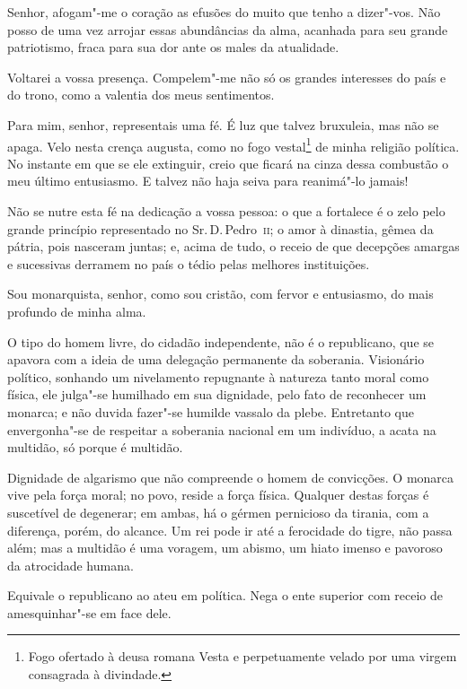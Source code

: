 \begin{linenumbers}

Senhor, afogam"-me o coração as efusões do muito que tenho a
dizer"-vos. Não posso de uma vez arrojar essas abundâncias da alma,
acanhada para seu grande patriotismo, fraca para sua dor ante os males da atualidade.

Voltarei a vossa presença. Compelem"-me não só os grandes interesses do
país e do trono, como a valentia dos meus sentimentos.

Para mim, senhor, representais uma fé. É luz que talvez bruxuleia, mas
não se apaga. Velo nesta crença augusta, como no fogo
vestal\footnote{ Fogo ofertado à deusa romana Vesta e
perpetuamente velado por uma virgem consagrada à divindade.} 
de minha religião política. No instante em que se ele extinguir, creio
que ficará na cinza dessa combustão o meu último entusiasmo. E talvez
não haja seiva para reanimá"-lo jamais! 

Não se nutre esta fé na dedicação a vossa pessoa: o que a fortalece é o
zelo pelo grande princípio representado no Sr.\,D.\,Pedro~\textsc{ii}; o amor à
dinastia, gêmea da pátria, pois nasceram juntas; e, acima de tudo, o
receio de que decepções amargas e sucessivas derramem no país o tédio
pelas melhores instituições.

Sou monarquista, senhor, como sou cristão, com fervor e entusiasmo, do
mais profundo de minha alma.

O tipo do homem livre, do cidadão independente, não é o republicano, que
se apavora com a ideia de uma delegação permanente da soberania.
Visionário político, sonhando um nivelamento repugnante à natureza
tanto moral como física, ele julga"-se humilhado em sua dignidade,
pelo fato de reconhecer um monarca; e não duvida fazer"-se humilde
vassalo da plebe. Entretanto que envergonha"-se de respeitar a
soberania nacional em um indivíduo, a acata na multidão, só porque é multidão.

Dignidade de algarismo que não compreende o homem de convicções. O
monarca vive pela força moral; no povo, reside a força física. Qualquer
destas forças é suscetível de degenerar; em ambas, há o gérmen
pernicioso da tirania, com a diferença, porém, do alcance. Um rei pode
ir até a ferocidade do tigre, não passa além; mas a multidão é uma
voragem, um abismo, um hiato imenso e pavoroso da atrocidade humana. 

Equivale o republicano ao ateu em política. Nega o ente superior com
receio de amesquinhar"-se em face dele.


\end{linenumbers}
